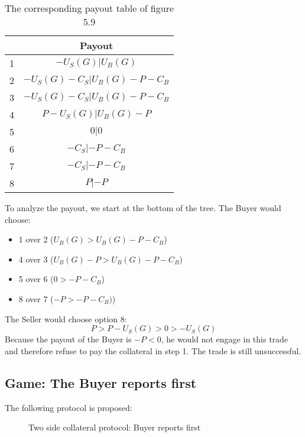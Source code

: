 \documentclass{cacthesis}
\begin{document}
\begin{table}[htb!]
    \centering
    \begin{tabular}{ |c|c| }
    \hline
    & Payout  \\
    \hline
    \hline
    1& $-U_S(G) | U_B(G)$\\
    \hline
    2& $-U_S(G) - C_S| U_B(G)- P - C_B $\\
    \hline
    3&$-U_S(G) - C_S | U_B(G) -P - C_B$ \\
    \hline
    4& $P-U_S(G)| U_B(G)-P$\\
    \hline
    5& $0|0$\\
    \hline 
    6& $-C_S |-P - C_B$\\
    \hline
    7& $-C_S| -P-C_B$\\
    \hline
    8& $P| -P$\\
    \hline
    \end{tabular}
    \caption{The corresponding payout table of figure 5.9}
\end{table}

To analyze the payout, we start at the bottom of the tree. The Buyer would choose:
\begin{itemize}
    \item 1 over 2 ($U_B(G) > U_B(G) -P -C_B$)
    \item 4 over 3 ($U_B(G) - P > U_B(G) -P -C_B$)
    \item 5 over 6 ($0 > -P -C_B$)
    \item 8 over 7 ($-P > -P -C_B)$)
\end{itemize}
The Seller would choose option 8:
\[P>P-U_S(G)>0>-U_S(G)\]
Because the payout of the Buyer is $-P<0$, he would not engage in this trade and therefore refuse to pay the collateral in step 1. The trade is still unsuccessful.

\subsection{Game: The Buyer reports first}
The following protocol is proposed:
\begin{figure}[htb!]
    \centering
    \caption{Two side collateral protocol: Buyer reports first}
    \label{pro:two-side-collateral-Buyer-first}
\end{figure}
\end{document}
